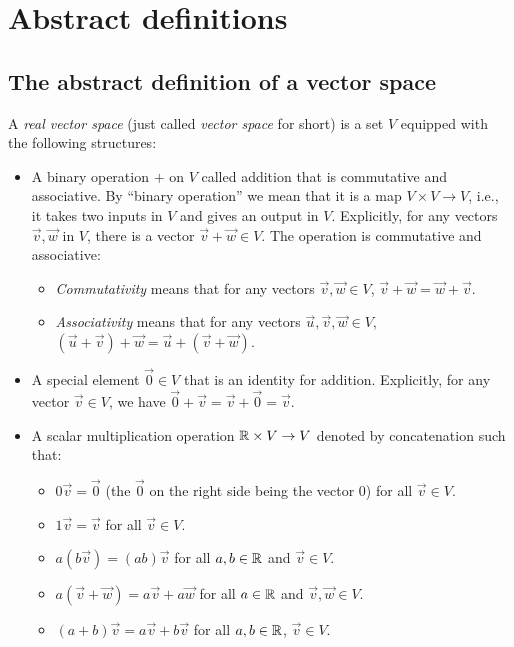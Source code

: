 \documentclass[10pt]{amsart}
\begin{document}
\section{Abstract definitions}

\subsection{The abstract definition of a vector space}

A {\em real vector space} (just called {\em vector space} for short)
is a set $V$ equipped with the following structures:

\begin{itemize}
\item A binary operation $+$ on $V$ called addition that is
  commutative and associative. By ``binary operation'' we mean that it
  is a map $V \times V \to V$, i.e., it takes two inputs in $V$ and
  gives an output in $V$. Explicitly, for any vectors $\vec{v},
  \vec{w}$ in $V$, there is a vector $\vec{v} + \vec{w} \in V$. The
  operation is commutative and associative:

  \begin{itemize}
  \item {\em Commutativity} means that for any vectors $\vec{v},\vec{w}
    \in V$, $\vec{v} + \vec{w} = \vec{w} + \vec{v}$.
  \item {\em Associativity} means that for any vectors
    $\vec{u},\vec{v},\vec{w} \in V$, $(\vec{u} + \vec{v}) + \vec{w} =
    \vec{u} + (\vec{v} + \vec{w})$.
  \end{itemize}
\item A special element $\vec{0} \in V$ that is an identity for
  addition. Explicitly, for any vector $\vec{v} \in V$, we have
  $\vec{0} + \vec{v} = \vec{v} + \vec{0} = \vec{v}$.
\item A scalar multiplication operation $\mathbb{R} \times V \to V$ denoted
  by concatenation such that:
  \begin{itemize}
  \item $0\vec{v} = \vec{0}$ (the $\vec{0}$ on the right side being the vector
    $0$) for all $\vec{v} \in V$.
  \item $1\vec{v} = \vec{v}$ for all $\vec{v} \in V$.
  \item $a(b\vec{v}) = (ab)\vec{v}$ for all $a,b \in \mathbb{R}$ and
      $\vec{v} \in V$.
  \item $a(\vec{v} + \vec{w}) = a\vec{v} + a\vec{w}$ for all $a \in
    \mathbb{R}$ and $\vec{v},\vec{w} \in V$.
  \item $(a + b)\vec{v} = a\vec{v} + b\vec{v}$ for all $a,b \in \mathbb{R}$,
    $\vec{v} \in V$.
    \end{itemize}
\end{itemize}
\end{document}
